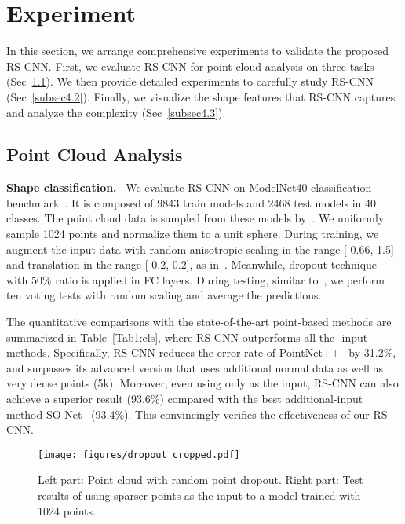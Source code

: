 \documentclass[10pt,twocolumn,letterpaper]{article}
\begin{document}
\section{Experiment}
\label{sec:experiment}
In this section, we arrange comprehensive experiments to validate the proposed RS-CNN. First, we evaluate RS-CNN for point cloud analysis on three tasks (Sec~\ref{subsec4.1}). We then provide detailed experiments to carefully study RS-CNN (Sec~\ref{subsec4.2}). Finally, we visualize the shape features that RS-CNN captures and analyze the complexity (Sec~\ref{subsec4.3}).

\subsection{Point Cloud Analysis}
\label{subsec4.1}
\noindent \textbf{Shape classification.}\,\,~We evaluate RS-CNN on ModelNet40 classification benchmark~\cite{modelnet40}. It is composed of 9843 train models and 2468 test models in 40 classes. The point cloud data is sampled from these models by~\cite{c1_pointnet}. We uniformly sample 1024 points and normalize them to a unit sphere. During training, we augment the input data with random anisotropic scaling in the range [-0.66, 1.5] and translation in the range [-0.2, 0.2], as in~\cite{c26}. Meanwhile, dropout technique~\cite{dropout} with 50\% ratio is applied in FC layers. During testing, similar to~\cite{c1_pointnet,c2_pointnet2}, we perform ten voting tests with random scaling and average the predictions.

The quantitative comparisons with the state-of-the-art point-based methods are summarized in Table~\ref{Tab1:cls}, where RS-CNN outperforms all the -input methods. Specifically, RS-CNN reduces the error rate of PointNet++~\cite{c2_pointnet2} by 31.2\%, and surpasses its advanced version that uses additional normal data as well as very dense points (5k). Moreover, even using only  as the input, RS-CNN can also achieve a superior result (93.6\%) compared with the best additional-input method SO-Net~\cite{c20} (93.4\%). This convincingly verifies the effectiveness of our RS-CNN.

\begin{figure}[t]
\centerline{\texttt{[image: figures/dropout\_cropped.pdf]}}
\caption{Left part: Point cloud with random point dropout. Right part: Test results of using sparser points as the input to a model trained with 1024 points.}
\label{fig5:sample_density}
\vspace{5pt}
\end{figure}
\end{document}
